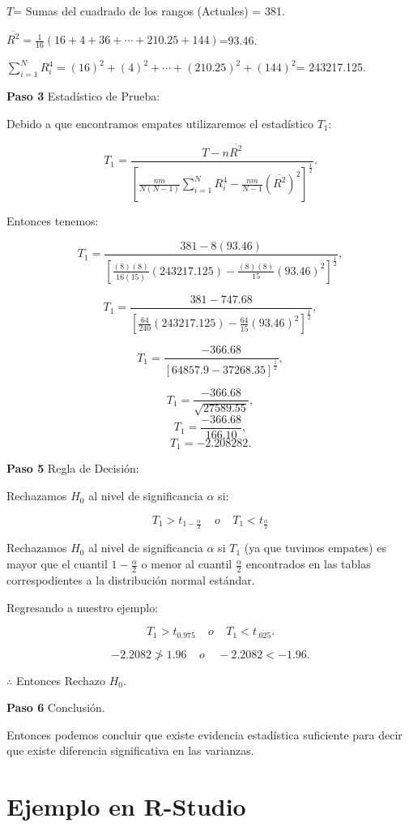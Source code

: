 \documentclass[
  a4paper,
  oneside,
  openany]{book}
\begin{document}
\(T\)= Sumas del cuadrado de los rangos (Actuales) = 381.

\(\overline{R^2}= \frac{1}{16}\left(16+4+36+\cdots+210.25+144\right)\)=93.46.

\(\sum_{i=1}^{N}R_{i}^4= (16)^2+(4)^2+\cdots+(210.25)^2+(144)^2\)= 243217.125.

\textbf{Paso 3} Estadístico de Prueba:

Debido a que encontramos empates utilizaremos el estadístico \(T_{1}\):

\[T_{1} = \frac{T-n\overline{R^2}}{\left[\frac{nm}{N(N-1)}\sum_{i=1}^{N}R_{i}^4-\frac{nm}{N-1}(\overline{R^2})^2\right]^\frac{1}{2}}.\]

Entonces tenemos:

\[T_{1} = \frac{381-8(93.46)}{\left[\frac{(8)(8)}{16(15)}(243217.125)-\frac{(8)(8)}{15}(93.46)^2\right]^\frac{1}{2}},\]

\[T_{1} = \frac{381-747.68}{\left[\frac{64}{240}(243217.125)-\frac{64}{15}(93.46)^2\right]^\frac{1}{2}},\]

\[T_{1} = \frac{-366.68}{[64857.9-37268.35]^\frac{1}{2}},\]

\[T_{1} = \frac{-366.68}{\sqrt{27589.55}},\]
\[T_{1} = \frac{-366.68}{166.10},\]
\[T_{1}= -2.208282.\]

\textbf{Paso 5} Regla de Decisión:

Rechazamos \(H_0\) al nivel de significancia \(\alpha\) si:

\[T_{1}>t_{1-\frac{\alpha}{2}} \ \ \ \ \  o  \ \ \ \ \ T_{1}<t_{\frac{\alpha}{2}}\]

Rechazamos \(H_0\) al nivel de significancia \(\alpha\) si \(T_{1}\) (ya que tuvimos empates) es mayor que el cuantil \(1-\frac{\alpha}{2}\) o menor al cuantil \(\frac{\alpha}{2}\) encontrados en las tablas correspodientes a la distribución normal estándar.

Regresando a nuestro ejemplo:

\[T_{1}>t_{0.975} \ \ \ \ \  o \ \ \ \ \ T_{1}<t_{.025}.\]

\[-2.2082 \ngtr 1.96  \ \ \ \ \   o  \ \ \ \ \  -2.2082 < -1.96.\]

\(\therefore\) Entonces Rechazo \(H_0\).

\textbf{Paso 6} Conclusión.

Entonces podemos concluir que existe evidencia estadística suficiente para decir que existe diferencia significativa en las varianzas.

\hypertarget{ejemplo-en-r-studio-7}{%
\section{Ejemplo en R-Studio}\label{ejemplo-en-r-studio-7}}
\end{document}
